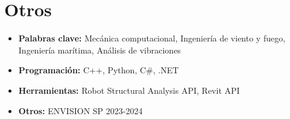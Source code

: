 \documentclass[12pt]{article}
\begin{document}
\section{Otros}
\begin{itemize}
    \itemsep=-.3em
    \item \textbf{Palabras clave:} Mecánica computacional, Ingeniería de viento y fuego, Ingeniería marítima, Análisis de vibraciones
    \item \textbf{Programación:} C++, Python, C\#, .NET
    \item \textbf{Herramientas:} Robot Structural Analysis API, Revit API
    \item \textbf{Otros:} ENVISION SP 2023-2024
\end{itemize}
\end{document}
